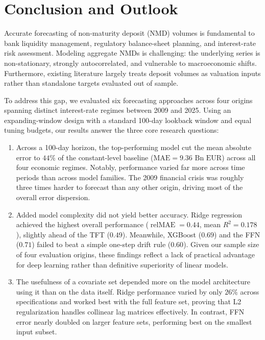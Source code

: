 \documentclass[11pt,a4paper]{article}
\begin{document}
\section{Conclusion and Outlook}
\label{sec:conclusion}

Accurate forecasting of non-maturity deposit (NMD) volumes is fundamental to bank liquidity management, regulatory balance-sheet planning, and interest-rate risk assessment. Modeling aggregate NMDs is challenging: the underlying series is non-stationary, strongly autocorrelated, and vulnerable to macroeconomic shifts. Furthermore, existing literature largely treats deposit volumes as valuation inputs rather than standalone targets evaluated out of sample.

To address this gap, we evaluated six forecasting approaches across four origins spanning distinct interest-rate regimes between 2009 and 2025. Using an expanding-window design with a standard 100-day lookback window and equal tuning budgets, our results answer the three core research questions:

\begin{enumerate}
    \item Across a 100-day horizon, the top-performing model cut the mean absolute error to $44\%$ of the constant-level baseline ($\text{MAE} = 9.36\text{ Bn EUR}$) across all four economic regimes. Notably, performance varied far more across time periods than across model families. The 2009 financial crisis was roughly three times harder to forecast than any other origin, driving most of the overall error dispersion.
    
    \item Added model complexity did not yield better accuracy. Ridge regression achieved the highest overall performance ($\operatorname{relMAE} = 0.44$, mean $R^2 = 0.178$), slightly ahead of the TFT ($0.49$). Meanwhile, XGBoost ($0.69$) and the FFN ($0.71$) failed to beat a simple one-step drift rule ($0.60$). Given our sample size of four evaluation origins, these findings reflect a lack of practical advantage for deep learning rather than definitive superiority of linear models.
    
    \item The usefulness of a covariate set depended more on the model architecture using it than on the data itself. Ridge performance varied by only $26\%$ across specifications and worked best with the full feature set, proving that L2 regularization handles collinear lag matrices effectively. In contrast, FFN error nearly doubled on larger feature sets, performing best on the smallest input subset.
\end{enumerate}
\end{document}
